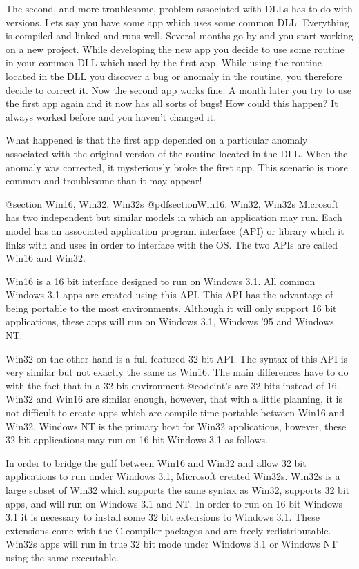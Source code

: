 The second, and more troublesome, problem associated with DLLs has to do
with versions.  Lets say you have some app which uses some common DLL.
Everything is compiled and linked and runs well.  Several months go by
and you start working on a new project.  While developing the new app
you decide to use some routine in your common DLL which used by the
first app.  While using the routine located in the DLL you discover a
bug or anomaly in the routine, you therefore decide to correct it.
Now the second app works fine.  A month later you try to use the first
app again and it now has all sorts of bugs!  How could this happen?
It always worked before and you haven't changed it.

What happened is that the first app depended on a particular anomaly
associated with the original version of the routine located in the DLL.
When the anomaly was corrected, it mysteriously broke the first app.
This scenario is more common and troublesome than it may appear!



@section Win16, Win32, Win32s
@pdfsection{Win16, Win32, Win32s}
Microsoft has two independent but similar models in which an application
may run.  Each model has an associated application program interface
(API) or library which it links with and uses in order to interface with
the OS.  The two APIs are called Win16 and Win32.

Win16 is a 16 bit interface designed to run on Windows 3.1.  All common
Windows 3.1 apps are created using this API.  This API has the advantage
of being portable to the most environments.  Although it will only
support 16 bit applications, these apps will run on Windows 3.1, Windows
'95 and Windows NT.

Win32 on the other hand is a full featured 32 bit API.  The syntax of
this API is very similar but not exactly the same as Win16.  The main
differences have to do with the fact that in a 32 bit environment
@code{int}'s are 32 bits instead of 16.  Win32 and Win16 are similar
enough, however, that with a little planning, it is not difficult to
create apps which are compile time portable between Win16 and Win32.
Windows NT is the primary host for Win32 applications, however,
these 32 bit applications may run on 16 bit Windows 3.1 as follows.

In order to bridge the gulf between Win16 and Win32 and allow 32 bit
applications to run under Windows 3.1, Microsoft created Win32s.  Win32s
is a large subset of Win32 which supports the same syntax as Win32,
supports 32 bit apps, and will run on Windows 3.1 and NT.  In order to
run on 16 bit Windows 3.1 it is necessary to install some 32 bit
extensions to Windows 3.1.  These extensions come with the C compiler
packages and are freely redistributable.  Win32s apps will run in true
32 bit mode under Windows 3.1 or Windows NT using the same executable.

